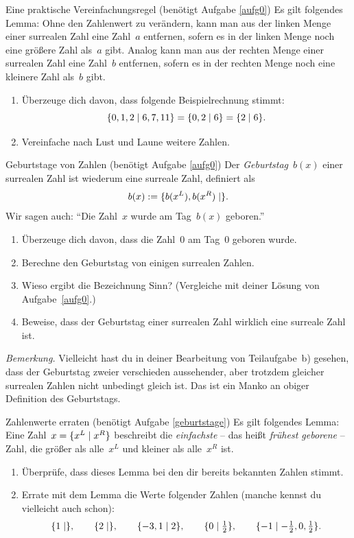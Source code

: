 \documentclass{../zirkelblatt}
\begin{document}
\begin{aufgabe}{Eine praktische Vereinfachungsregel (benötigt Aufgabe \ref{aufg0})}
\label{vereinfachungsregel}
Es gilt folgendes Lemma: Ohne den Zahlenwert zu verändern, kann man aus der
linken Menge einer surrealen Zahl eine Zahl~$a$ entfernen, sofern es in der
linken Menge noch eine größere Zahl als~$a$ gibt. Analog kann man aus der
rechten Menge einer surrealen Zahl eine Zahl~$b$ entfernen, sofern es in der
rechten Menge noch eine kleinere Zahl als~$b$ gibt.
\begin{enumerate}
\item Überzeuge dich davon, dass folgende Beispielrechnung stimmt:
\[ \{ 0,1,2 \mathrel{|} 6,7,11 \} = \{ 0,2 \mathrel{|} 6 \} = \{ 2 \mathrel{|} 6 \}. \]
\item Vereinfache nach Lust und Laune weitere Zahlen.
\end{enumerate}
\end{aufgabe}

\begin{aufgabe}{Geburtstage von Zahlen (benötigt Aufgabe \ref{aufg0})}
\label{geburtstage}
Der \emph{Geburtstag}~$b(x)$ einer surrealen Zahl ist wiederum eine surreale
Zahl, definiert als
\[ b(x) := \{ b(x^L), b(x^R) \mathrel{|}  \}. \]
Wir sagen auch: "`Die Zahl~$x$ wurde am Tag~$b(x)$ geboren."'
\begin{enumerate}
\item Überzeuge dich davon, dass die Zahl~$0$ am Tag~$0$ geboren wurde.
\item Berechne den Geburtstag von einigen surrealen Zahlen.
\item Wieso ergibt die Bezeichnung Sinn? (Vergleiche mit deiner Lösung von
Aufgabe~\ref{aufg0}.)
\item Beweise, dass der Geburtstag einer surrealen Zahl wirklich eine surreale
Zahl ist.
\end{enumerate}
\emph{Bemerkung.} Vielleicht hast du in deiner Bearbeitung von Teilaufgabe~b)
gesehen, dass der Geburtstag zweier verschieden aussehender, aber trotzdem
gleicher surrealen Zahlen nicht unbedingt gleich ist. Das ist ein Manko an obiger
Definition des Geburtstags.
\end{aufgabe}

\begin{aufgabe}{Zahlenwerte erraten (benötigt Aufgabe \ref{geburtstage})}
\label{zahlenraten}
Es gilt folgendes Lemma: Eine Zahl~$x = \{ x^L \mathrel{|} x^R \}$ beschreibt die
\emph{einfachste} -- das heißt \emph{frühest geborene} -- Zahl, die größer als
alle~$x^L$ und kleiner als alle~$x^R$ ist.

\begin{enumerate}
\item Überprüfe, dass dieses Lemma bei den dir bereits bekannten Zahlen stimmt.
\item Errate mit dem Lemma die Werte folgender Zahlen (manche kennst du
vielleicht auch schon):
\[ \{ 1 \mathrel{|}  \}, \qquad
  \{ 2 \mathrel{|}  \}, \qquad
  \{ -3,1 \mathrel{|} 2 \}, \qquad
  \{ 0 \mathrel{|} \tfrac{1}{2} \}, \qquad
  \{ -1 \mathrel{|} -\tfrac{1}{2},0,\tfrac{1}{2} \}. \]
\end{enumerate}
\end{aufgabe}
\end{document}
